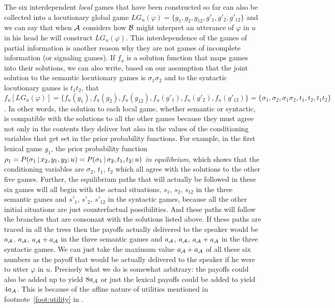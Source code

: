 The six interdependent \emph{local} games that have been constructed so far can also be collected into a locutionary global game $LG_u(\varphi) = \{g_1, g_2, g_{12}, g'_1, g'_2, g'_{12}\}$ and we can say that when $\cal A$ considers how $\cal B$ might interpret an utterance of $\varphi$ in $u$ in his head he will construct $LG_u(\varphi)$. This interdependence of the games of partial information is another reason why they are not games of incomplete information (or signaling games). If $f_u$ is a solution function that maps games into their solutions, we can also write, based on our assumption that the joint solution to the semantic locutionary games is $\sigma_1\sigma_2$ and to the syntactic locutionary games is $t_1t_2$, that $f_u[LG_u(\varphi)] = \{f_u(g_1), f_u(g_2), f_u(g_{12}), f_u(g'_1), f_u(g'_2), f_u(g'_{12})\} = \{\sigma_1,\allowbreak \sigma_2, \sigma_1\sigma_2, t_1, t_2, t_1t_2\}$. In other words, the solution to each local game, whether semantic or syntactic, is compatible with the solutions to all the other games because they must agree not only in the contents they deliver but also in the values of the conditioning variables that get set in the prior probability functions. For example, in the first lexical game $g_1$, the prior probability function $\rho_1 = P(\sigma_1 \,|\, x_2, y_1, y_2; u) = P(\sigma_1 \,|\, \sigma_2, t_1, t_2; u)$ \emph{in equilibrium}, which shows that the conditioning variables are $\sigma_2$, $t_1$, $t_2$ which all agree with the solutions to the other five games. Further, the equilibrium paths that will actually be followed in these six games will all begin with the actual situations, $s_1$, $s_2$, $s_{12}$ in the three semantic games and $s'_1$, $s'_2$, $s'_{12}$ in the syntactic games, because all the other initial situations are just counterfactual possibilities. And these paths will follow the branches that are consonant with the solutions listed above. If these paths are traced in all the trees then the payoffs actually delivered to the speaker would be $a_{\cal A}$, $a_{\cal A}$, $a_{\cal A} + a_{\cal A}$ in the three semantic games and $a_{\cal A}$, $a_{\cal A}$, $a_{\cal A} + a_{\cal A}$ in the three syntactic games. We can just take the maximum value $a_{\cal A} + a_{\cal A}$ of all these six numbers as the payoff that would be actually delivered to the speaker if he were to utter $\varphi$ in $u$. Precisely what we do is somewhat arbitrary: the payoffs could also be added up to yield $8a_{\cal A}$ or just the lexical payoffs could be added to yield $4a_{\cal A}$. This is because of the affine nature of utilities mentioned in footnote~\ref{foot:utility} in .

